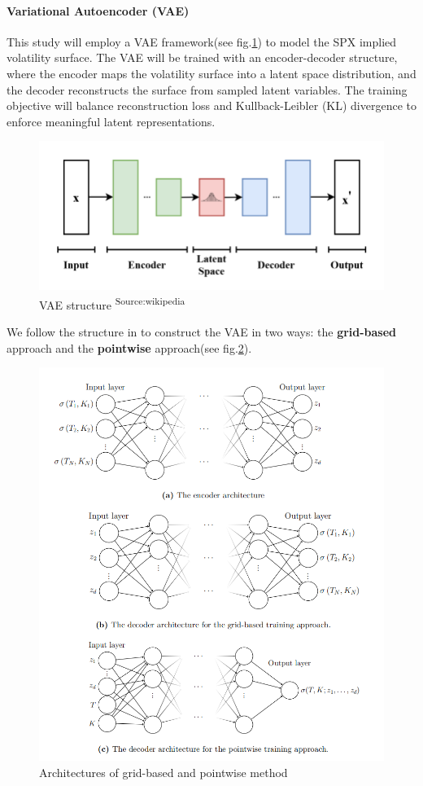 \documentclass{article}
\begin{document}
\paragraph{Variational Autoencoder (VAE)}
This study will employ a VAE framework(see fig.\ref{fig:a}) to model the SPX implied volatility surface. The VAE will be trained with an encoder-decoder structure, where the encoder maps the volatility surface into a latent space distribution, and the decoder reconstructs the surface from sampled latent variables. The training objective will balance reconstruction loss and Kullback-Leibler (KL) divergence to enforce meaningful latent representations.
\begin{figure}[htp]
    \centering
    \includegraphics[width=0.5\linewidth]{vaewiki.png}
    \caption{VAE structure \textsuperscript{Source:wikipedia}}
    \label{fig:a}
\end{figure}

We follow the structure in \cite{vaeorigin} to construct the VAE in two ways: the \textbf{grid-based} approach and the \textbf{pointwise} approach(see fig.\ref{fig:b}).
\begin{figure}[htp]
    \centering
    \includegraphics[width=0.8\linewidth]{vae_vol.png}
    \caption{Architectures of grid-based and pointwise method}
    \label{fig:b}
\end{figure}
\end{document}
